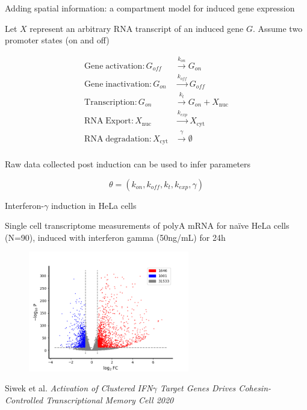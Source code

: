 \documentclass[aspectratio=1610]{beamer}					%
\begin{document}
\begin{frame}{Adding spatial information: a compartment model for induced gene expression}

Let $X$ represent an arbitrary RNA transcript of an induced gene $G$. Assume two promoter states (on and off)

\begin{align*}
\mathrm{Gene\;activation}: G_{off} &\overset{k_{on}}{\rightarrow} G_{on}\\
\mathrm{Gene\;inactivation}: G_{on} &\overset{k_{off}}{\rightarrow} G_{off}\\
\mathrm{Transcription}: G_{on} &\overset{k_{t}}{\rightarrow} G_{on} + X_{\mathrm{nuc}}\\
\mathrm{RNA \;Export}: X_{\mathrm{nuc}} &\overset{k_{exp}}{\rightarrow} X_{\mathrm{cyt}}\\
\mathrm{RNA\; degradation}: X_{\mathrm{cyt}} &\overset{\gamma}{\rightarrow} \emptyset\\
\end{align*}

Raw data collected post induction can be used to infer parameters

\begin{equation*}
\theta = \left( k_{on},k_{off},k_{t},k_{exp},\gamma\right)
\end{equation*}

\end{frame}

\begin{frame}{Interferon-$\gamma$ induction in HeLa cells}

\vspace{0.1in}
Single cell transcriptome measurements of polyA mRNA for naïve HeLa cells (N=90), induced with interferon gamma (50ng/mL) for 24h

\begin{figure}
\includegraphics[width=7cm]{volcano.png}
\end{figure}

{\tiny Siwek et al. 
\it{Activation of Clustered IFN$\gamma$ Target Genes Drives Cohesin-Controlled Transcriptional Memory} Cell 2020}

\end{frame}
\end{document}
